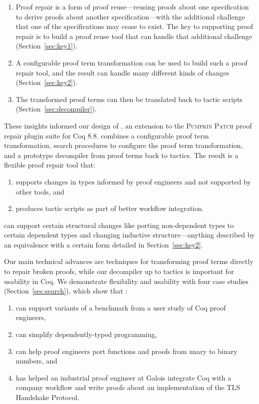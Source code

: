 \begin{enumerate}
\item Proof repair is a form of proof reuse---reusing proofs about one specification to derive proofs about another specification---with 
the additional challenge that one of the specifications may cease to exist.
The key to supporting proof repair is to build a proof reuse
tool that can handle that additional challenge (Section~\ref{sec:key1}). 
\item A configurable proof term transformation can be used to build such a proof repair tool,
and the result can handle many different kinds of changes (Section~\ref{sec:key2}).
\item The transformed proof terms can then be translated back to tactic scripts (Section~\ref{sec:decompiler}).
\end{enumerate}

These insights informed our design of \toolname, an extension to the \textsc{Pumpkin Patch} proof repair plugin suite for Coq 8.8.
\toolname combines a configurable proof term transformation,
search procedures to configure the proof term transformation,
and a prototype decompiler from proof terms back to tactics.
The result is a flexible proof repair tool that: 

\begin{enumerate}
\item supports changes in types informed by proof engineers and not supported by other tools, and
\item produces tactic scripts as part of better workflow integration.
\end{enumerate}
\toolname can support certain structural changes like porting non-dependent types to certain dependent types
and changing inductive structure---anything described by an equivalence with a certain form
detailed in Section~\ref{sec:key2}.

Our main technical advances are techniques for transforming proof terms directly to repair broken proofs, 
while our decompiler up to tactics is important for usability in Coq.
We demonstrate flexibility and usability with four case studies (Section~\ref{sec:search}), which show that \toolname:

\begin{enumerate}
\item can support variants of a benchmark from a user study of Coq proof engineers,
\item can simplify dependently-typed programming, %
\item can help proof engineers port functions and proofs from unary to binary numbers, and
\item has helped an industrial proof engineer at Galois integrate Coq with a company workflow and write proofs about an implementation of the TLS Handshake Protocol.
\end{enumerate}

